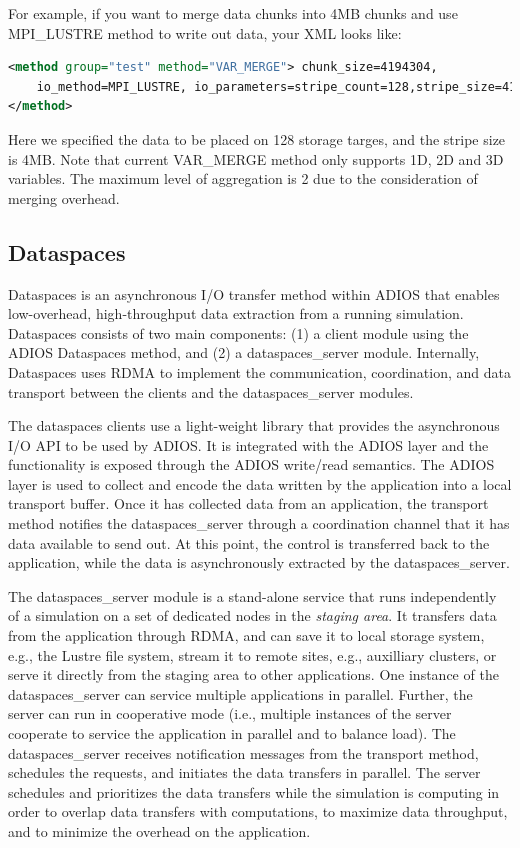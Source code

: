 For example, if you want to merge data chunks into 4MB chunks and use
MPI\_LUSTRE method to write out data, your XML looks like:  

\begin{lstlisting}[language=XML]
<method group="test" method="VAR_MERGE"> chunk_size=4194304,
    io_method=MPI_LUSTRE, io_parameters=stripe_count=128,stripe_size=4194304
</method>
\end{lstlisting}

Here we specified the data to be placed on 128 storage targes, and the stripe
size is 4MB.
Note that current VAR\_MERGE method only supports 1D, 2D and 3D variables.
The maximum level of aggregation is 2 due to the consideration of
merging overhead.  

\subsection{Dataspaces}
\label{section-method-dataspaces}

Dataspaces is an asynchronous I/O transfer method within ADIOS that enables low-overhead, 
high-throughput data extraction from a running simulation. Dataspaces consists of two 
main components: (1) a client module using the ADIOS Dataspaces method, and (2)
a dataspaces\_server module. Internally, 
Dataspaces uses RDMA to implement the communication, coordination, and data transport 
between the clients and the dataspaces\_server modules.

The dataspaces clients use a light-weight library that provides the asynchronous
I/O API to be used by ADIOS. It is integrated with the ADIOS layer and the
functionality is exposed through the ADIOS write/read semantics. 
The ADIOS layer is used to collect and encode the data written 
by the application into a local transport buffer. Once it has collected data from 
an application, the transport method notifies the dataspaces\_server through a coordination channel 
that it has data available to send out. At this point, the control is
transferred back to the application, while the data is asynchronously extracted 
by the dataspaces\_server.

The dataspaces\_server module is a stand-alone service that runs independently of a simulation 
on a set of dedicated nodes in the 
{\em staging area}. It transfers data from the application through RDMA,  
and can save it to local storage system, e.g., the Lustre file system, stream it to 
remote sites, e.g., auxilliary clusters, or serve it directly from the staging area to 
other applications. One instance of the dataspaces\_server can service multiple applications 
 in parallel. Further, the server can run in cooperative mode (i.e., multiple 
instances of the server cooperate to service the application in parallel and to balance 
load). The dataspaces\_server receives notification messages from the transport method, schedules 
the requests, and initiates the data transfers  in parallel. The 
server schedules and prioritizes the data transfers while the simulation is computing 
in order to overlap data transfers with computations, to maximize data throughput, 
and to minimize the overhead on the application.

